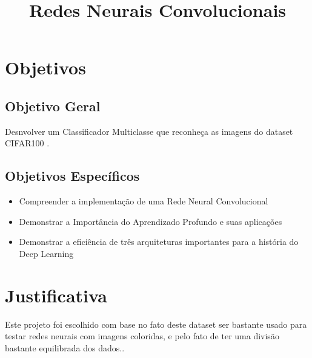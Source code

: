 \documentclass[conference]{IEEEtran}
\begin{document}
\title{Redes Neurais Convolucionais}

\author{
\and
{}

}

\maketitle





\section{Objetivos}

\subsection{Objetivo Geral}

Desnvolver um Classificador Multiclasse que reconheça as imagens do dataset CIFAR100 \cite{dataset}. 
\subsection{Objetivos Específicos}
\begin{itemize}
\item Compreender a implementação de uma Rede Neural Convolucional
\item Demonstrar a Importância do Aprendizado Profundo e suas aplicações
\item Demonstrar a eficiência de três arquiteturas importantes para a história do Deep Learning
\end{itemize}
\section{Justificativa}
Este projeto foi escolhido com base no fato deste dataset ser bastante usado para testar redes neurais com imagens coloridas, 
e pelo fato de ter uma divisão bastante equilibrada dos dados.\cite{dataset}.
\end{document}
